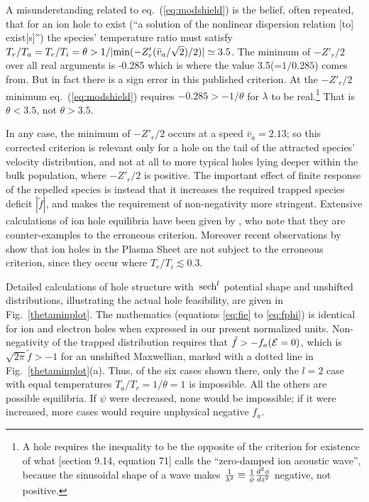 \documentclass[aip,pop,article-title]{revtex4-2}
\def\energy{{\cal E}}
\def\sech{{\,\rm sech}}
\begin{document}
A misunderstanding related to eq.\ (\ref{eq:modshield}) is the
belief\cite{Schamel1980}, often
repeated\cite{Bujarbarua1981,Schamel1982,Hudson1983,Pecseli1984,Johnsen1987,Buchanan1993,Griessmeier2002,Eliasson2006a,Schamel2018,Wang2021},
that for an ion hole to exist (``a solution of the nonlinear
dispersion relation [to] exist[s]'') the species' temperature ratio
must satisfy
$T_r/T_a=T_e/T_i=\theta > 1/|{\rm min}(-Z'_r(\bar
v_a/\sqrt{2})/2)|\simeq 3.5$. The minimum of $-Z'_r/2$ over all real
arguments is -0.285 which is where the value 3.5(=$1/0.285$) comes
from. But in fact there is a sign error in this published
criterion. At the $-Z'_r/2$ minimum eq.\ (\ref{eq:modshield}) requires
$-0.285>-1/\theta$ for $\lambda$ to be real.\footnote{A hole requires
  the inequality to be the opposite of the criterion for existence of
  what {\citet{Stix1962}} [section 9.14, equation 71] calls the
  ``zero-damped ion acoustic wave'', because the sinusoidal shape of a
  wave makes ${1\over \lambda^2} \equiv {1\over \phi}{d^2\phi\over dz^2}$
  negative, not positive.}  That is $\theta < 3.5$, not
$\theta > 3.5$.

In any case, the minimum of $-Z'_r/2$ occurs at a speed
$\bar v_a= 2.13$; so this corrected criterion is relevant only for a
hole on the tail of the attracted species' velocity distribution, and
not at all to more typical holes lying deeper within the bulk
population, where $-Z'_r/2$ is positive. The important effect of
finite response of the repelled species is instead that it increases
the required trapped species deficit $|\tilde f|$, and makes the
requirement of non-negativity more stringent. Extensive calculations
of ion hole equilibria have been given by \citet{Chen2004},
who note that they are counter-examples to the erroneous criterion.
Moreover recent observations by \citet{Wang2022} show that ion holes
in the Plasma Sheet are not subject to the erroneous criterion, since
they occur where $T_e/T_i\lesssim 0.3$.

Detailed calculations of hole structure with $\sech^l$ potential shape
and unshifted distributions, illustrating the actual hole feasibility,
are given in Fig.\ \ref{thetaminplot}.
The mathematics (equations \ref{eq:fie} to \ref{eq:fphi}) is identical
for ion and electron holes when expressed in our present normalized
units. Non-negativity of the trapped distribution requires that
$\tilde f > -f_a(\energy=0)$, which is $\sqrt{2\pi}\tilde f > -1$ for
an unshifted Maxwellian, marked with a dotted line in Fig.\
\ref{thetaminplot}(a). Thus, of the six cases shown there, only the
$l=2$ case with equal temperatures $T_a/T_r=1/\theta=1$ is impossible. All the
others are possible equilibria. If $\psi$ were decreased, none would
be impossible; if it were increased, more cases would require
unphysical negative $f_a$.
\end{document}

